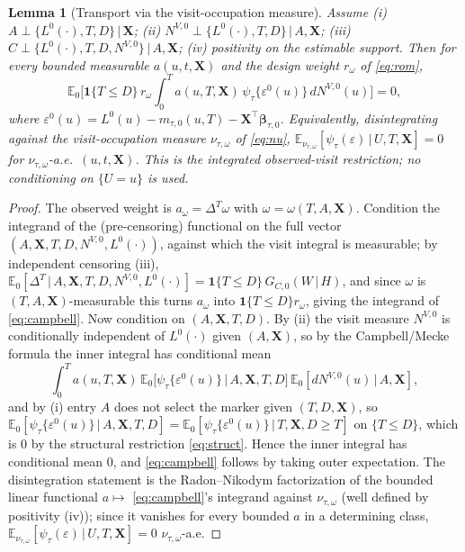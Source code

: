 \documentclass[11pt]{article}
\newtheorem{lemma}{Lemma}
\theoremstyle{remark}\newtheorem{remark}{Remark}
\newcommand{\E}{\mathbb{E}}
\newcommand{\X}{\bm{X}}
\newcommand{\bbeta}{\bm{\beta}}
\newcommand{\indc}[1]{\mathbf{1}\{#1\}}
\newcommand{\given}{\,\vert\,}
\begin{document}
\begin{lemma}[Transport via the visit-occupation measure]\label{lem:transport}
Assume \emph{(i)} $A\perp\{L^0(\cdot),T,D\}\given\X$; \emph{(ii)}
$N^{V,0}\perp\{L^0(\cdot),T,D\}\given A,\X$; \emph{(iii)}
$C\perp\{L^0(\cdot),T,D,N^{V,0}\}\given A,\X$; \emph{(iv)} positivity on the
estimable support. Then for \emph{every} bounded measurable $a(u,t,\X)$ and the
design weight $r_\omega$ of \eqref{eq:rom},
\begin{equation}
\E_0\!\Big[\indc{T\le D}\,r_\omega\!\int_0^{T}a(u,T,\X)\,
   \psi_\tau\{\varepsilon^0(u)\}\,dN^{V,0}(u)\Big]=0,
\label{eq:campbell}
\end{equation}
where $\varepsilon^0(u)=L^0(u)-m_{\tau,0}(u,T)-\X^\top\bbeta_{\tau,0}$.
Equivalently, disintegrating against the visit-occupation measure
$\nu_{\tau,\omega}$ of \eqref{eq:nu}, $\E_{\nu_{\tau,\omega}}[\psi_\tau(\varepsilon)
\given U,T,\X]=0$ for $\nu_{\tau,\omega}$-a.e.\ $(u,t,\X)$. This is the
integrated observed-visit restriction; no conditioning on $\{U=u\}$ is used.
\end{lemma}
\begin{proof}
The observed weight is $a_\omega=\Delta^T\omega$ with $\omega=\omega(T,A,\X)$.
Condition the integrand of the (pre-censoring) functional on the full vector
$(A,\X,T,D,N^{V,0},L^0(\cdot))$, against which the visit integral is measurable;
by independent censoring (iii), $\E_0[\Delta^T\given A,\X,T,D,N^{V,0},L^0(\cdot)]
=\indc{T\le D}\,G_{C,0}(W\given H)$, and since $\omega$ is $(T,A,\X)$-measurable
this turns $a_\omega$ into $\indc{T\le D}r_\omega$, giving the integrand of
\eqref{eq:campbell}. Now condition on $(A,\X,T,D)$. By (ii) the visit measure
$N^{V,0}$ is conditionally independent of $L^0(\cdot)$ given $(A,\X)$, so by the
Campbell/Mecke formula the inner integral has conditional mean
\[
\int_0^{T}a(u,T,\X)\,\E_0\!\big[\psi_\tau\{\varepsilon^0(u)\}\given
   A,\X,T,D\big]\,\E_0[dN^{V,0}(u)\given A,\X],
\]
and by (i) entry $A$ does not select the marker given $(T,D,\X)$, so
$\E_0[\psi_\tau\{\varepsilon^0(u)\}\given A,\X,T,D]
=\E_0[\psi_\tau\{\varepsilon^0(u)\}\given T,\X,D\ge T]$ on $\{T\le D\}$, which is
$0$ by the structural restriction \eqref{eq:struct}. Hence the inner integral has
conditional mean $0$, and \eqref{eq:campbell} follows by taking outer expectation.
The disintegration statement is the Radon--Nikodym factorization of the bounded
linear functional $a\mapsto$ \eqref{eq:campbell}'s integrand against
$\nu_{\tau,\omega}$ (well defined by positivity (iv)); since it vanishes for every
bounded $a$ in a determining class, $\E_{\nu_{\tau,\omega}}[\psi_\tau(\varepsilon)
\given U,T,\X]=0$ $\nu_{\tau,\omega}$-a.e.
\end{proof}
\end{document}
